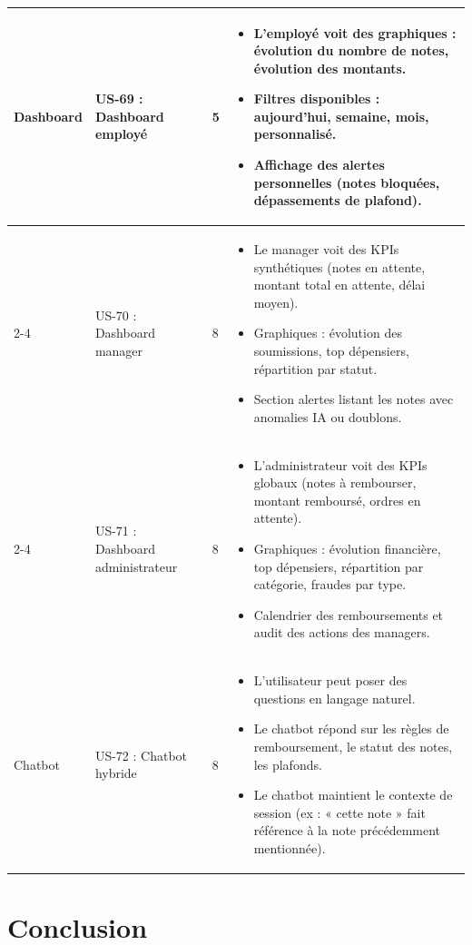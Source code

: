 \documentclass[12pt,a4paper]{report}
\begin{document}
\begin{longtable}{|p{2.5cm}|p{3cm}|p{1.5cm}|p{8cm}|}
\multirow{3}{*}{Dashboard} & US-69 : Dashboard employé & 5 & \begin{itemize}
 \item L’employé voit des graphiques : évolution du nombre de notes, évolution des montants.
 \item Filtres disponibles : aujourd’hui, semaine, mois, personnalisé.
 \item Affichage des alertes personnelles (notes bloquées, dépassements de plafond).
\end{itemize} \\
\cline{2-4}
& US-70 : Dashboard manager & 8 & \begin{itemize}
 \item Le manager voit des KPIs synthétiques (notes en attente, montant total en attente, délai moyen).
 \item Graphiques : évolution des soumissions, top dépensiers, répartition par statut.
 \item Section alertes listant les notes avec anomalies IA ou doublons.
\end{itemize} \\
\cline{2-4}
& US-71 : Dashboard administrateur & 8 & \begin{itemize}
 \item L’administrateur voit des KPIs globaux (notes à rembourser, montant remboursé, ordres en attente).
 \item Graphiques : évolution financière, top dépensiers, répartition par catégorie, fraudes par type.
 \item Calendrier des remboursements et audit des actions des managers.
\end{itemize} \\
\hline

Chatbot & US-72 : Chatbot hybride & 8 & \begin{itemize}
 \item L’utilisateur peut poser des questions en langage naturel.
 \item Le chatbot répond sur les règles de remboursement, le statut des notes, les plafonds.
 \item Le chatbot maintient le contexte de session (ex : « cette note » fait référence à la note précédemment mentionnée).
\end{itemize} \\
\hline

\end{longtable}
\section*{Conclusion}
\end{document}
